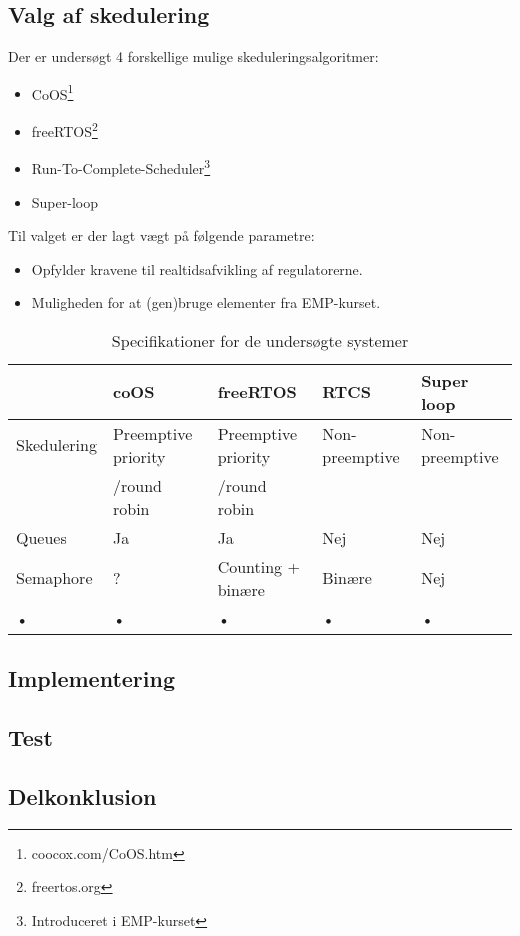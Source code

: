 \subsection{Valg af skedulering}
Der er undersøgt 4 forskellige mulige skeduleringsalgoritmer: 

\begin{itemize}
	\item CoOS\footnote{coocox.com/CoOS.htm}
	\item freeRTOS\footnote{freertos.org}
	\item Run-To-Complete-Scheduler\footnote{Introduceret i EMP-kurset}
	\item Super-loop
\end{itemize}

Til valget er der lagt vægt på følgende parametre: 

\begin{itemize}
	\item Opfylder kravene til realtidsafvikling af regulatorerne. 
	\item Muligheden for at (gen)bruge elementer fra EMP-kurset.
\end{itemize}

\begin{table}[h!]
\begin{tabular}{|l|l|l|l|l|}
\hline 
 & coOS & freeRTOS & RTCS & Super loop \\ 
\hline 
Skedulering & Preemptive priority  & Preemptive priority  & Non-preemptive & Non-preemptive  \\ 
			& /round robin		&	/round robin & &	\\
\hline 
Queues & Ja & Ja & Nej & Nej \\ 
\hline 
Semaphore & ?  & Counting + binære & Binære  & Nej  \\ 
\hline 
• & • & • & • & • \\ 
\hline 
\end{tabular} 
\caption{Specifikationer for de undersøgte systemer}
\label{tb:os_comparison}
\end{table}

\subsection{Implementering}
\subsection{Test} 
\subsection{Delkonklusion}

